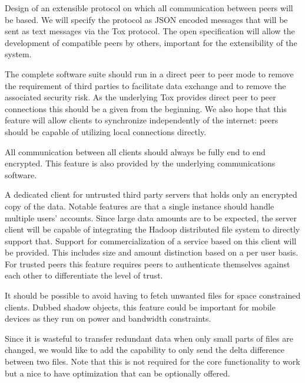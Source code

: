 \begin{description}[leftmargin=2em,style=nextline,noitemsep,nolistsep]
\item[Protocol]
    Design of an extensible protocol on which all communication between peers will be based.
    We will specify the protocol as JSON encoded messages that will be sent as text messages via the Tox protocol.
    The open specification will allow the development of compatible peers by others, important for the extensibility of the system.
\item[Peer to Peer Architecture]
    The complete software suite should run in a direct peer to peer mode to remove the requirement of third parties to facilitate data exchange and to remove the associated security risk.
    As the underlying Tox provides direct peer to peer connections this should be a given from the beginning.
    We also hope that this feature will allow clients to synchronize independently of the internet: peers should be capable of utilizing local connections directly.
\item[Secure Transport]
    All communication between all clients should always be fully end to end encrypted.
    This feature is also provided by the underlying communications software.
\item[Third Party Client]
    A dedicated client for untrusted third party servers that holds only an encrypted copy of the data.
    Notable features are that a single instance should handle multiple users' accounts.
    Since large data amounts are to be expected, the server client will be capable of integrating the Hadoop distributed file system to directly support that.
    Support for commercialization of a service based on this client will be provided.
    This includes size and amount distinction based on a per user basis.
    For trusted peers this feature requires peers to authenticate themselves against each other to differentiate the level of trust.
\item[Shadow Files]
    It should be possible to avoid having to fetch unwanted files for space constrained clients.
    Dubbed shadow objects, this feature could be important for mobile devices as they run on power and bandwidth constraints.
\item[Delta Updates]
    Since it is wasteful to transfer redundant data when only small parts of files are changed, we would like to add the capability to only send the delta difference between two files.
    Note that this is not required for the core functionality to work but a nice to have optimization that can be optionally offered.

\end{description}
